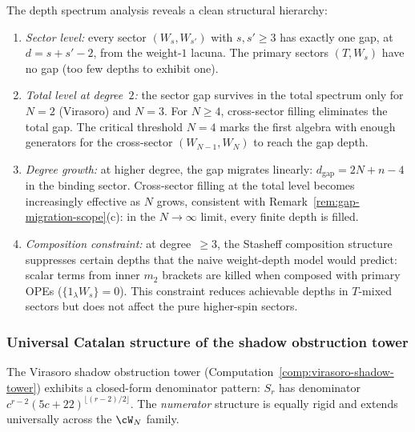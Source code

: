 \begin{remark}%
\label{rem:depth-landscape-summary}%
%
The depth spectrum analysis reveals a clean structural
hierarchy:
\begin{enumerate}[label=\textup{(\roman*)}]
\item \emph{Sector level:} every sector $(W_s, W_{s'})$
 with $s, s' \ge 3$ has exactly one gap, at
 $d = s + s' - 2$, from the weight-$1$ lacuna.
 The primary sectors $(T, W_s)$ have no gap (too few
 depths to exhibit one).
\item \emph{Total level at degree~$2$:} the sector gap
 survives in the total spectrum only for
 $N = 2$ \textup{(Virasoro)} and $N = 3$.
 For $N \ge 4$, cross-sector filling eliminates the
 total gap. The critical threshold $N = 4$ marks the
 first algebra with enough generators for the
 cross-sector $(W_{N-1}, W_N)$ to reach the gap depth.
\item \emph{Degree growth:} at higher degree, the gap
 migrates linearly: $d_{\mathrm{gap}} = 2N + n - 4$
 in the binding sector. Cross-sector filling
 at the total level becomes increasingly effective as
 $N$ grows, consistent with
 Remark~\ref{rem:gap-migration-scope}(c):
 in the $N \to \infty$ limit, every finite depth
 is filled.
\item \emph{Composition constraint:} at degree~$\ge 3$,
 the Stasheff composition structure suppresses certain
 depths that the naive weight-depth model would predict:
 scalar terms from inner $m_2$ brackets are killed when
 composed with primary OPEs ($\{1_\lambda W_s\} = 0$).
 This constraint reduces achievable depths in $T$-mixed
 sectors but does not affect the pure higher-spin sectors.
\end{enumerate}
\end{remark}

\subsubsection{Universal Catalan structure of the shadow obstruction tower}
\label{subsubsec:catalan-shadow}

The Virasoro shadow obstruction tower
(Computation~\ref{comp:virasoro-shadow-tower}) exhibits a
closed-form denominator pattern:
$S_r$ has denominator $c^{r-2}(5c+22)^{\lfloor(r-2)/2\rfloor}$.
The \emph{numerator} structure is equally rigid and extends
universally across the $\cW_N$ family.

